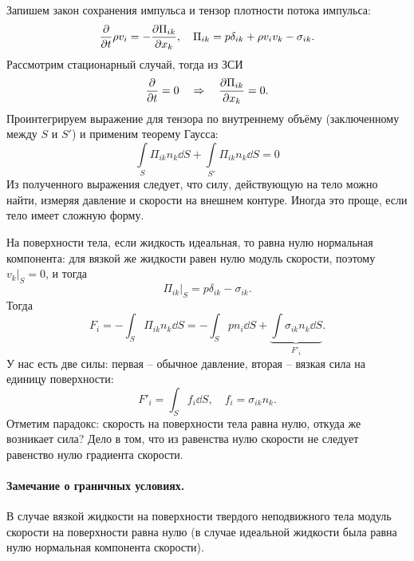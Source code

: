 Запишем закон сохранения импульса и тензор плотности потока импульса:
\begin{equation}
	\pdv{t} \rho v_i = -\pdv{\Pi_{ik}}{x_k}, \quad
	\Pi_{ik} = p\delta_{ik}+\rho v_i v_k - \sigma_{ik}.
\end{equation}
Рассмотрим стационарный случай, тогда из ЗСИ
\begin{equation}
    \pdv{t} = 0 \quad \Rightarrow \quad \pdv{\Pi_{ik}}{x_k}=0.
\end{equation}
Проинтегрируем выражение для тензора по внутреннему объёму (заключенному между $S$ и $S'$)  и применим теорему  Гаусса:
\begin{equation}
    \int\limits_S \Pi_{ik} n_k \dd{S} + \int\limits_{S'} \Pi_{ik} n_k \dd{S} = 0
\end{equation}
Из полученного выражения следует, что силу, действующую на тело можно найти, измеряя давление и скорости на внешнем контуре. Иногда это проще, если тело имеет сложную форму.


На поверхности тела, если жидкость идеальная, то равна нулю нормальная компонента: для вязкой же жидкости равен нулю модуль скорости, поэтому $v_k |_S=0$, и тогда
\begin{equation}
 	\Pi_{ik}\big|_S = p\delta_{ik}-\sigma_{ik}.
 \end{equation} 
 Тогда
\begin{equation}
    F_i = -\int_S \Pi_{ik} n_k \dd{S} =  -\int_S p n_i \dd{S} + \underbrace{\int \sigma_{ik} n_k \dd{S}}_{F'_i}.
\end{equation}
У нас есть две силы: первая -- обычное давление, вторая --  вязкая сила на единицу поверхности:
\begin{equation}
    F'_i = \int_S f_i \dd{S}, \quad f_i=\sigma_{ik} n_k.
\end{equation}
Отметим парадокс: скорость на поверхности тела равна нулю,  откуда же возникает сила? Дело в том, что из равенства нулю скорости не следует равенство нулю градиента скорости.



\paragraph{Замечание о граничных условиях.} В случае вязкой жидкости на поверхности твердого неподвижного тела модуль скорости на поверхности равна нулю (в случае идеальной жидкости была равна нулю нормальная компонента скорости).

